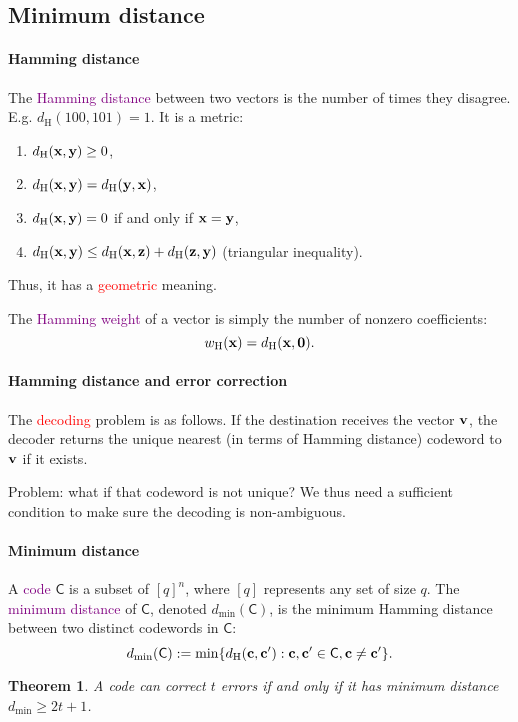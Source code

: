\documentclass[a4paper, 11pt, openany]{book}
\numberwithin{equation}{section}
\theoremstyle{plain}
\newtheorem{theorem}	[equation]	{Theorem}
\theoremstyle{definition}
\newcommand{\dH}{d_\mathrm{H}}
\newcommand{\dmin}{d_{\min}}
\newcommand{\wH}{w_\mathrm{H}}
\newcommand{\Important}[1]{\textcolor{red}{#1}}
\newcommand{\Define}[1]{\textcolor{purple}{#1}}
\newcommand{\code}[1]{\mathsf{#1}}
\begin{document}
\subsection{Minimum distance}

\paragraph{Hamming distance}
The \Define{Hamming distance} between two vectors is the number of times they disagree. E.g. $\dH(100,101) = 1$. It is a metric:
\begin{enumerate}
	\item $\dH({\bf x},{\bf y}) \ge 0$,
	\item $\dH({\bf x},{\bf y}) = \dH({\bf y},{\bf x})$,
	\item $\dH({\bf x},{\bf y}) = 0$ if and only if ${\bf x}={\bf y}$,
	\item $\dH({\bf x},{\bf y}) \le \dH({\bf x},{\bf z}) + \dH({\bf z},{\bf y})$ (triangular inequality).
\end{enumerate}
Thus, it has a \Important{geometric} meaning.

The \Define{Hamming weight} of a vector is simply the number of nonzero coefficients:
\[
	\wH({\bf x}) = \dH({\bf x}, {\bf 0}).
\]


\paragraph{Hamming distance and error correction}
The \Important{decoding} problem is as follows. If the destination receives the vector ${\bf v}$, the decoder returns the unique nearest (in terms of Hamming distance) codeword to ${\bf v}$ if it exists.

Problem: what if that codeword is not unique? We thus need a sufficient condition to make sure the decoding is non-ambiguous.


\paragraph{Minimum distance}
A \Define{code} $\code{C}$ is a subset of $[q]^n$, where $[q]$ represents any set of size $q$. The \Define{minimum distance} of $\code{C}$, denoted $\dmin(\code{C})$, is the minimum Hamming distance between two distinct codewords in $\code{C}$:
\[
    \dmin(\code{C}) := \min\{ \dH({\bf c}, {\bf c}'): {\bf c}, {\bf c}' \in \code{C}, {\bf c} \ne {\bf c}' \}. 
\]

\begin{theorem}
A code can correct $t$ errors if and only if it has minimum distance $\dmin \ge 2t+1$.
\end{theorem}
\end{document}
